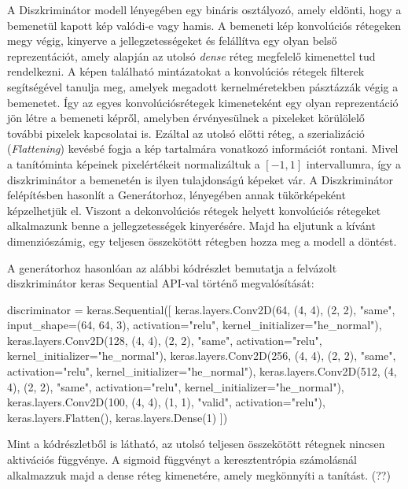 A Diszkriminátor modell lényegében egy bináris osztályozó, amely eldönti, hogy a bemenetül kapott kép valódi-e vagy hamis. A bemeneti kép konvolúciós rétegeken megy végig, kinyerve a jellegzetességeket és felállítva egy olyan belső reprezentációt, amely alapján az utolsó \textit{dense} réteg megfelelő kimenettel tud rendelkezni. A képen található mintázatokat a konvolúciós rétegek filterek segítségével tanulja meg, amelyek megadott kernelméretekben pásztázzák végig a bemenetet. Így az egyes konvolúciósrétegek kimeneteként egy olyan reprezentáció jön létre a bemeneti képről, amelyben érvényesülnek a pixeleket körülölelő további pixelek kapcsolatai is. Ezáltal az utolsó előtti réteg, a szerializáció (\textit{Flattening}) kevésbé fogja a kép tartalmára vonatkozó információt rontani. Mivel a tanítóminta képeinek pixelértékeit normalizáltuk a $[-1, 1]$ intervallumra, így a diszkriminátor a bemenetén is ilyen tulajdonságú képeket vár. A Diszkriminátor felépítésben hasonlít a Generátorhoz, lényegében annak tükörképeként képzelhetjük el. Viszont a dekonvolúciós rétegek helyett konvolúciós rétegeket alkalmazunk benne a jellegzetességek kinyerésére. Majd ha eljutunk a kívánt dimenziószámig, egy teljesen összekötött rétegben hozza meg a modell a döntést.

A generátorhoz hasonlóan az alábbi kódrészlet bemutatja a felvázolt diszkriminátor keras Sequential API-val történő megvalósítását:
\begin{python}
discriminator = keras.Sequential([
    keras.layers.Conv2D(64, (4, 4), (2, 2), "same",
                        input_shape=(64, 64, 3), activation="relu",
                        kernel_initializer="he_normal"),
    keras.layers.Conv2D(128, (4, 4), (2, 2), "same", activation="relu",
                        kernel_initializer="he_normal"),
    keras.layers.Conv2D(256, (4, 4), (2, 2), "same", activation="relu",
                        kernel_initializer="he_normal"),
    keras.layers.Conv2D(512, (4, 4), (2, 2), "same", activation="relu",
                        kernel_initializer="he_normal"),
    keras.layers.Conv2D(100, (4, 4), (1, 1), "valid", activation="relu"),
    keras.layers.Flatten(),
    keras.layers.Dense(1)
])
\end{python}

Mint a kódrészletből is látható, az utolsó teljesen összekötött rétegnek nincsen aktivációs függvénye. A sigmoid függvényt a keresztentrópia számolásnál alkalmazzuk majd a dense réteg kimenetére, amely megkönnyíti a tanítást. (??)

